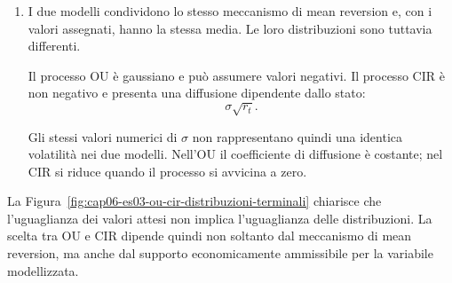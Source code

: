 \begin{enumerate}
\item I due modelli condividono lo stesso meccanismo di mean reversion
e, con i valori assegnati, hanno la stessa media. Le loro distribuzioni
sono tuttavia differenti.


Il processo OU \`{e} gaussiano e pu\`{o} assumere valori negativi. Il
processo CIR \`{e} non negativo e presenta una diffusione dipendente
dallo stato:
\[
\sigma\sqrt{r_t}.
\]

Gli stessi valori numerici di $\sigma$ non rappresentano quindi una
identica volatilit\`{a} nei due modelli. Nell'OU il coefficiente di
diffusione \`{e} costante; nel CIR si riduce quando il processo si
avvicina a zero.

\end{enumerate}


La Figura~\ref{fig:cap06-es03-ou-cir-distribuzioni-terminali} chiarisce
che l'uguaglianza dei valori attesi non implica l'uguaglianza delle
distribuzioni. La scelta tra OU e CIR dipende quindi non soltanto dal
meccanismo di mean reversion, ma anche dal supporto economicamente
ammissibile per la variabile modellizzata.


